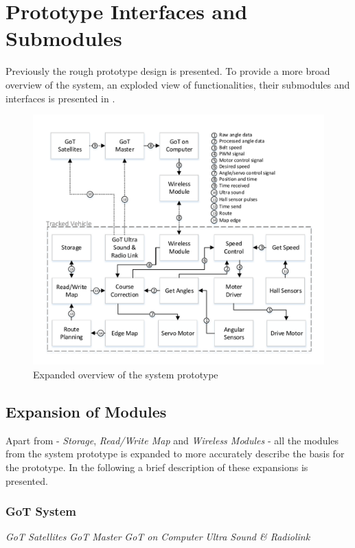 \section{Prototype Interfaces and Submodules}
Previously the rough prototype design is presented. To provide a more broad overview of the system, an exploded view of functionalities, their submodules and interfaces is presented in .

\begin{figure}[H]
	\centering
	\includegraphics[scale=.9]{figures/systemOverview2}
	\caption{Expanded overview of the system prototype}
	\label{fig:systemOverview2}
\end{figure}

\subsection{Expansion of Modules}
Apart from - \textit{Storage}, \textit{Read/Write Map} and \textit{Wireless Modules} - all the modules from the system prototype is expanded to more accurately describe the basis for the prototype. In the following a brief description of these expansions is presented.

\subsubsection{GoT System}
\textit{GoT Satellites} \textit{GoT Master} \textit{GoT on Computer} \textit{Ultra Sound \& Radiolink}

